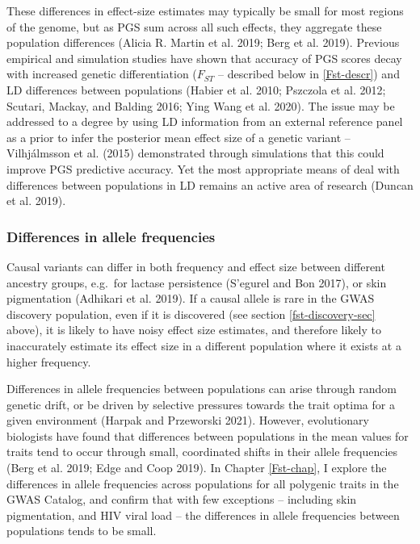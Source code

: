 \documentclass[
]{book}
\begin{document}
These differences in effect-size estimates may typically be small for most regions of the genome, but as PGS sum across all such effects, they aggregate these population differences (Alicia R. Martin et al. 2019; Berg et al. 2019). Previous empirical and simulation studies have shown that accuracy of PGS scores decay with increased genetic differentiation (\(F_{ST}\) -- described below in \ref{Fst-descr}) and LD differences between populations (Habier et al. 2010; Pszczola et al. 2012; Scutari, Mackay, and Balding 2016; Ying Wang et al. 2020). The issue may be addressed to a degree by using LD information from an external reference panel as a prior to infer the posterior mean effect size of a genetic variant -- Vilhjálmsson et al. (2015) demonstrated through simulations that this could improve PGS predictive accuracy. Yet the most appropriate means of deal with differences between populations in LD remains an active area of research (Duncan et al. 2019).

\hypertarget{differences-in-allele-frequencies}{%
\subsubsection{Differences in allele frequencies}\label{differences-in-allele-frequencies}}

Causal variants can differ in both frequency and effect size between different ancestry groups, e.g.~for lactase persistence (S'egurel and Bon 2017), or skin pigmentation (Adhikari et al. 2019). If a causal allele is rare in the GWAS discovery population, even if it is discovered (see section \ref{fst-discovery-sec} above), it is likely to have noisy effect size estimates, and therefore likely to inaccurately estimate its effect size in a different population where it exists at a higher frequency.

Differences in allele frequencies between populations can arise through random genetic drift, or be driven by selective pressures towards the trait optima for a given environment (Harpak and Przeworski 2021). However, evolutionary biologists have found that differences between populations in the mean values for traits tend to occur through small, coordinated shifts in their allele frequencies (Berg et al. 2019; Edge and Coop 2019). In Chapter \ref{Fst-chap}, I explore the differences in allele frequencies across populations for all polygenic traits in the GWAS Catalog, and confirm that with few exceptions -- including skin pigmentation, and HIV viral load -- the differences in allele frequencies between populations tends to be small.
\end{document}
